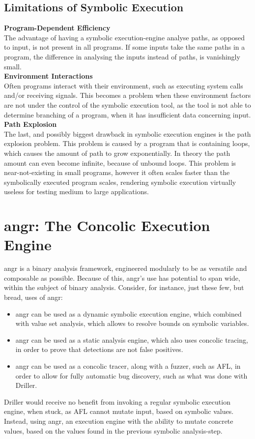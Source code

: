 \documentclass[a4paper]{article}
\newcommand{\tbf}[1]{\textbf{#1}}
\newcommand{\subsubsubsection}[1]{\tbf{#1}\\}
\begin{document}
\subsection{Limitations of Symbolic Execution}
\subsubsubsection{Program-Dependent Efficiency}
The advantage of having a symbolic execution-engine analyse paths, as opposed to input, is not present in all programs. If some inputs take the same paths in a program, the difference in analysing the inputs instead of paths, is vanishingly small.\\
\subsubsubsection{Environment Interactions}
Often programs interact with their environment, such as executing system calls and/or receiving signals. This becomes a problem when these environment factors are not under the control of the symbolic execution tool, as the tool is not able to determine branching of a program, when it has insufficient data concerning input.\\
\subsubsubsection{Path Explosion}
The last, and possibly biggest drawback in symbolic execution engines is the path explosion problem. This problem is caused by a program that is containing loops, which causes the amount of path to grow exponentially. In theory the path amount can even become infinite, because of unbound loops. This problem is near-not-existing in small programs, however it often scales faster than the symbolically executed program scales, rendering symbolic execution virtually useless for testing medium to large applications.
\section{angr: The Concolic Execution Engine}
angr is a binary analysis framework, engineered modularly to be as versatile and composable as possible. Because of this, angr's use has potential to span wide, within the subject of binary analysis. Consider, for instance, just these few, but bread, uses of angr:
\begin{itemize}
	\item angr can be used as a dynamic symbolic execution engine, which combined with value set analysis, which allows to resolve bounds on symbolic variables.
	\item angr can be used as a static analysis engine, which also uses concolic tracing, in order to prove that detections are not false positives.
	\item angr can be used as a concolic tracer, along with a fuzzer, such as AFL, in order to allow for fully automatic bug discovery, such as what was done with Driller.
\end{itemize}
Driller would receive no benefit from invoking a regular symbolic execution engine, when stuck, as AFL cannot mutate input, based on symbolic values. Instead, using angr, an execution engine with the ability to mutate concrete values, based on the values found in the previous symbolic analysis-step.
\end{document}

